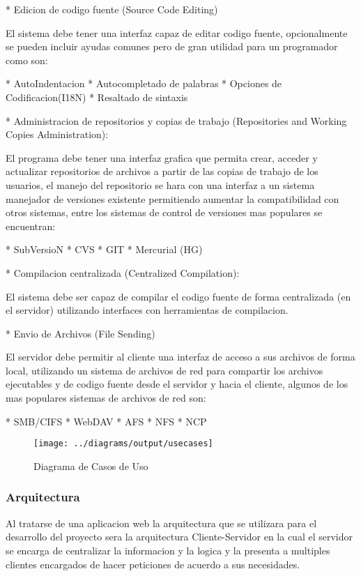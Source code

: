 * Edicion de codigo fuente (Source Code Editing)

El sistema debe tener una interfaz capaz de editar codigo fuente, opcionalmente se pueden incluir ayudas comunes pero de gran utilidad para un programador como son:

* AutoIndentacion
* Autocompletado de palabras
* Opciones de Codificacion(I18N)
* Resaltado de sintaxis


* Administracion de repositorios y copias de trabajo (Repositories and Working Copies Administration):

El programa debe tener una interfaz grafica que permita crear, acceder y actualizar repositorios de archivos a partir de las copias de trabajo de los usuarios, el manejo del repositorio se hara con una interfaz a un sistema manejador de versiones existente permitiendo aumentar la compatibilidad con otros sistemas, entre los sistemas de control de versiones mas populares se encuentran:

* SubVersioN
* CVS
* GIT
* Mercurial (HG)


* Compilacion centralizada (Centralized Compilation):

El sistema debe ser capaz de compilar el codigo fuente de forma centralizada (en el servidor) utilizando interfaces con herramientas de compilacion.

* Envio de Archivos (File Sending)

El servidor debe permitir al cliente una interfaz de acceso a sus archivos de forma local, utilizando un sistema de archivos de red para compartir los archivos ejecutables y de codigo fuente desde el servidor y hacia el cliente, algunos de los mas populares sistemas de archivos de red son:

* SMB/CIFS
* WebDAV
* AFS
* NFS
* NCP

\newpage
\begin{figure}
 \centering
 \texttt{[image: ../diagrams/output/usecases]}
 \caption{Diagrama de Casos de Uso}
 \label{diagrama:casos_uso}
\end{figure}


\subsubsection{Arquitectura}

Al tratarse de una aplicacion web la arquitectura que se utilizara para el desarrollo del proyecto sera la arquitectura Cliente-Servidor en la cual el servidor se encarga de centralizar la informacion y la logica y la presenta a multiples clientes encargados de hacer peticiones de acuerdo a sus necesidades.


